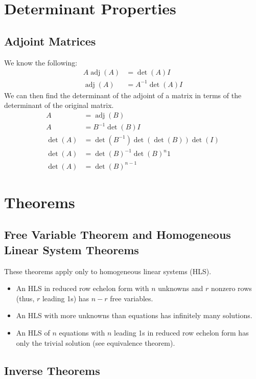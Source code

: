 \documentclass[12pt]{article}
\DeclareMathOperator{\adj}{adj}
\begin{document}
\section{Determinant Properties}


\subsection{Adjoint Matrices}

We know the following:
\begin{align*}
    A\adj(A) &= \det(A)I\\
    \adj(A) &= A^{-1}\det(A)I
\end{align*}
We can then find the determinant of the adjoint of a matrix in terms of the determinant of the original matrix.
\begin{align*}
    A &= \adj(B)\\
    A &= B^{-1}\det(B)I\\
    \det(A) &= \det(B^{-1}) \det(\det(B)) \det(I)\\
    \det(A) &= \det(B)^{-1} \det(B)^n 1\\
    \det(A) &= \det(B)^{n-1}
\end{align*}


\section{Theorems}


\subsection{Free Variable Theorem and Homogeneous Linear System Theorems}

These theorems apply only to homogeneous linear systems (HLS).
\begin{itemize}
    \item An HLS in reduced row echelon form with $n$ unknowns and $r$ nonzero rows (thus, $r$ leading 1s) has $n - r$ free variables.
    \item An HLS with more unknowns than equations has infinitely many solutions.
    \item An HLS of $n$ equations with $n$ leading 1s in reduced row echelon form has only the trivial solution (see equivalence theorem).
\end{itemize}


\subsection{Inverse Theorems}
\end{document}
